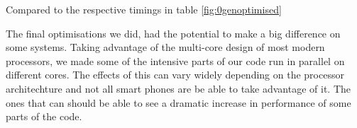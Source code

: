 \begin{threeparttable}[]
    \centering
    \begin{tablenotes}
        \footnotesize{\item[\textdagger] Compared to the respective timings in table \ref{fig:0genoptimised}}
    \end{tablenotes}
    \caption{Second round of optimisations. Using a pointer to recieve \lstinline|Bitmap| data directly and improved edge adding logic.}
    \label{fig:2genoptimised}
\end{threeparttable}

The final optimisations we did, had the potential to make a big difference on some systems.
Taking advantage of the multi-core design of most modern processors, we made some of the intensive parts of our code run in parallel on different cores.
The effects of this can vary widely depending on the processor architechture and not all smart phones are be able to take advantage of it.
The ones that can should be able to see a dramatic increase in performance of some parts of the code.

